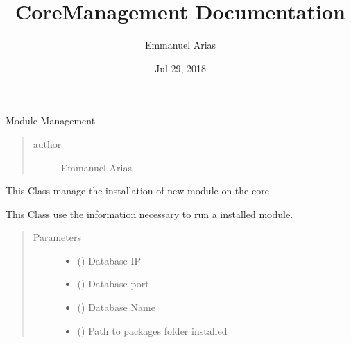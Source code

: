\documentclass[letterpaper,10pt,english]{sphinxmanual}
\title{CoreManagement Documentation}
\date{Jul 29, 2018}
\author{Emmanuel Arias}
\begin{document}
\maketitle
\sphinxtableofcontents
{}\label{\detokenize{index::doc}}

\label{\detokenize{index:module-src.ModuleManagement}}
Module Management
\begin{quote}\begin{description}
\item[{author}] \leavevmode
Emmanuel Arias

\end{description}\end{quote}

\begin{fulllineitems}
\label{\detokenize{index:src.ModuleManagement.ModuleManagement}}
This Class manage the installation of new module on the core

This Class use the information necessary to run a
installed module.
\begin{quote}\begin{description}
\item[{Parameters}] \leavevmode\begin{itemize}
\item {} 
 () \textendash{} Database IP

\item {} 
 () \textendash{} Database port

\item {} 
 () \textendash{} Database Name

\item {} 
 () \textendash{} Path to packages folder installed


\end{itemize}
\end{description}
\end{quote}
\end{fulllineitems}
\end{document}
